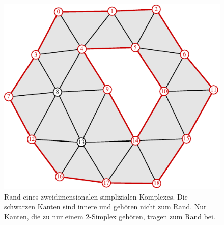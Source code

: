 %
%
%
\begin{figure}
\centering
\includegraphics{chapters/120-topologie/images/rand.pdf}
\caption{Rand eines zweidimensionalen simplizialen Komplexes.
Die schwarzen Kanten sind innere und gehören nicht zum Rand.
Nur Kanten, die zu nur einem 2-Simplex gehören, tragen zum Rand bei.
\label{buch:topologie:homologie:fig:rand}}
\end{figure}
